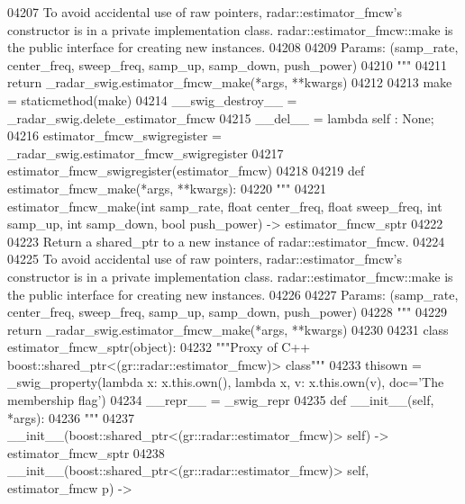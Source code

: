 \begin{DoxyCode}
{{{{{{{{{{{{{{{04207 \textcolor{stringliteral}{        To avoid accidental use of raw pointers, radar::estimator\_fmcw's constructor is in a private
       implementation class. radar::estimator\_fmcw::make is the public interface for creating new instances.}
04208 \textcolor{stringliteral}{}
04209 \textcolor{stringliteral}{        Params: (samp\_rate, center\_freq, sweep\_freq, samp\_up, samp\_down, push\_power)}
04210 \textcolor{stringliteral}{        """}
04211         \textcolor{keywordflow}{return} \_radar\_swig.estimator\_fmcw\_make(*args, **kwargs)
04212 
04213     make = staticmethod(make)
04214     \_\_swig\_destroy\_\_ = \_radar\_swig.delete\_estimator\_fmcw
04215     \_\_del\_\_ = \textcolor{keyword}{lambda} self : \textcolor{keywordtype}{None};
04216 estimator\_fmcw\_swigregister = \_radar\_swig.estimator\_fmcw\_swigregister
04217 estimator_fmcw_swigregister(estimator\_fmcw)
04218 
04219 \textcolor{keyword}{def }estimator_fmcw_make(*args, **kwargs):
04220   \textcolor{stringliteral}{"""}
04221 \textcolor{stringliteral}{    estimator\_fmcw\_make(int samp\_rate, float center\_freq, float sweep\_freq, int samp\_up, int samp\_down,
       bool push\_power) -> estimator\_fmcw\_sptr}
04222 \textcolor{stringliteral}{}
04223 \textcolor{stringliteral}{    Return a shared\_ptr to a new instance of radar::estimator\_fmcw.}
04224 \textcolor{stringliteral}{}
04225 \textcolor{stringliteral}{    To avoid accidental use of raw pointers, radar::estimator\_fmcw's constructor is in a private
       implementation class. radar::estimator\_fmcw::make is the public interface for creating new instances.}
04226 \textcolor{stringliteral}{}
04227 \textcolor{stringliteral}{    Params: (samp\_rate, center\_freq, sweep\_freq, samp\_up, samp\_down, push\_power)}
04228 \textcolor{stringliteral}{    """}
04229   \textcolor{keywordflow}{return} \_radar\_swig.estimator\_fmcw\_make(*args, **kwargs)
04230 
04231 \textcolor{keyword}{class }estimator_fmcw_sptr(object):
04232     \textcolor{stringliteral}{"""Proxy of C++ boost::shared\_ptr<(gr::radar::estimator\_fmcw)> class"""}
04233     thisown = _swig_property(\textcolor{keyword}{lambda} x: x.this.own(), \textcolor{keyword}{lambda} x, v: x.this.own(v), doc=\textcolor{stringliteral}{'The membership flag'})
04234     \_\_repr\_\_ = \_swig\_repr
04235     \textcolor{keyword}{def }__init__(self, *args): 
04236         \textcolor{stringliteral}{"""}
04237 \textcolor{stringliteral}{        \_\_init\_\_(boost::shared\_ptr<(gr::radar::estimator\_fmcw)> self) -> estimator\_fmcw\_sptr}
04238 \textcolor{stringliteral}{        \_\_init\_\_(boost::shared\_ptr<(gr::radar::estimator\_fmcw)> self, estimator\_fmcw p) ->
}}}}}}}}}}}}}}}}
\end{DoxyCode}
